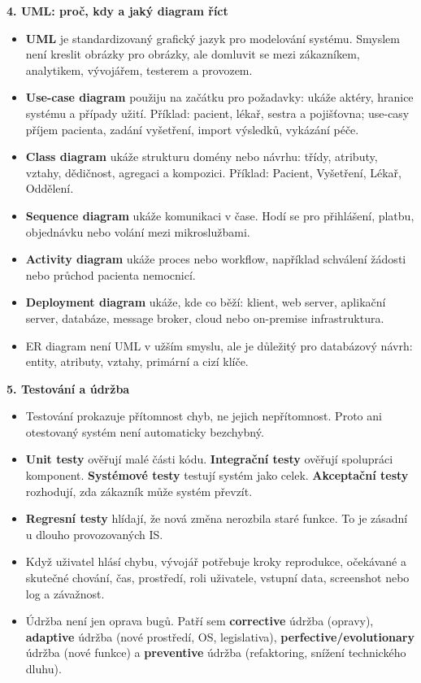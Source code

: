 \textbf{4. UML: proč, kdy a jaký diagram říct}
\begin{itemize}
  \item \textbf{UML} je standardizovaný grafický jazyk pro modelování systému. Smyslem není kreslit obrázky pro obrázky, ale domluvit se mezi zákazníkem, analytikem, vývojářem, testerem a provozem.
  \item \textbf{Use-case diagram} použiju na začátku pro požadavky: ukáže aktéry, hranice systému a případy užití. Příklad: pacient, lékař, sestra a pojišťovna; use-casy příjem pacienta, zadání vyšetření, import výsledků, vykázání péče.
  \item \textbf{Class diagram} ukáže strukturu domény nebo návrhu: třídy, atributy, vztahy, dědičnost, agregaci a kompozici. Příklad: Pacient, Vyšetření, Lékař, Oddělení.
  \item \textbf{Sequence diagram} ukáže komunikaci v čase. Hodí se pro přihlášení, platbu, objednávku nebo volání mezi mikroslužbami.
  \item \textbf{Activity diagram} ukáže proces nebo workflow, například schválení žádosti nebo průchod pacienta nemocnicí.
  \item \textbf{Deployment diagram} ukáže, kde co běží: klient, web server, aplikační server, databáze, message broker, cloud nebo on-premise infrastruktura.
  \item ER diagram není UML v užším smyslu, ale je důležitý pro databázový návrh: entity, atributy, vztahy, primární a cizí klíče.
\end{itemize}

\textbf{5. Testování a údržba}
\begin{itemize}
  \item Testování prokazuje přítomnost chyb, ne jejich nepřítomnost. Proto ani otestovaný systém není automaticky bezchybný.
  \item \textbf{Unit testy} ověřují malé části kódu. \textbf{Integrační testy} ověřují spolupráci komponent. \textbf{Systémové testy} testují systém jako celek. \textbf{Akceptační testy} rozhodují, zda zákazník může systém převzít.
  \item \textbf{Regresní testy} hlídají, že nová změna nerozbila staré funkce. To je zásadní u dlouho provozovaných IS.
  \item Když uživatel hlásí chybu, vývojář potřebuje kroky reprodukce, očekávané a skutečné chování, čas, prostředí, roli uživatele, vstupní data, screenshot nebo log a závažnost.
  \item Údržba není jen oprava bugů. Patří sem \textbf{corrective} údržba (opravy), \textbf{adaptive} údržba (nové prostředí, OS, legislativa), \textbf{perfective/evolutionary} údržba (nové funkce) a \textbf{preventive} údržba (refaktoring, snížení technického dluhu).
\end{itemize}

